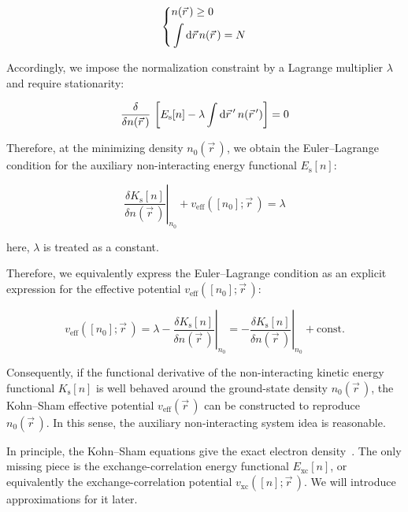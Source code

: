 \begin{equation}
\left\{
\begin{aligned}
    &n(\vec{r}\,) \ge 0 \\
    &\int\mathrm{d}{\vec{r}}\,n(\vec{r}\,) = N
\end{aligned}\right.
\label{admissible_density_conditions}
\end{equation}

Accordingly, we impose the normalization constraint by a Lagrange multiplier $\lambda$ and require stationarity:

\begin{equation}
    \frac{\delta}{\delta n(\vec{r}\,)}\,\left[
        E_\mathrm{s}[n]-\lambda\int\mathrm{d}{\vec{r}\,'}\,n(\vec{r}\,')
    \right]=0
\label{KS_auxiliary_density_stationarity}
\end{equation}

Therefore, at the minimizing density $n_0(\vec{r}\,)$,
we obtain the Euler--Lagrange condition for the auxiliary non-interacting energy functional $E_\mathrm{s}[n]$:

\begin{equation}
    \left.\frac{\delta K_\mathrm{s}[n]}{\delta n(\vec{r}\,)}\right|_{n_0}+v_\mathrm{eff}([n_0];\vec{r}\,)=\lambda
\label{KS_auxiliary_EL_condition}
\end{equation}

here, $\lambda$ is treated as a constant.

Therefore, we equivalently express the Euler--Lagrange condition as an explicit expression for the effective potential $v_\mathrm{eff}([n_0];\vec{r}\,)$:

\begin{equation}
    v_\mathrm{eff}([n_0];\vec{r}\,)
    = \lambda-\left.\frac{\delta K_\mathrm{s}[n]}{\delta n(\vec{r}\,)}\right|_{n_0}
    = -\left.\frac{\delta K_\mathrm{s}[n]}{\delta n(\vec{r}\,)}\right|_{n_0}+\mathrm{const.}
\label{KS_auxiliary_v_eff_from_Ts}
\end{equation}

Consequently, if the functional derivative of the non-interacting kinetic energy functional $K_\mathrm{s}[n]$ is well behaved around the ground-state density $n_0(\vec{r}\,)$,
the Kohn--Sham effective potential $v_\mathrm{eff}(\vec{r}\,)$ can be constructed to reproduce $n_0(\vec{r}\,)$.
In this sense, the auxiliary non-interacting system idea is reasonable.

In principle, the Kohn--Sham equations give the exact electron density~\cite{wagner2014kohn}.
The only missing piece is the exchange-correlation energy functional $E_\mathrm{xc}[n]$, or equivalently the exchange-correlation potential $v_\mathrm{xc}([n];\vec{r}\,)$.
We will introduce approximations for it later.

